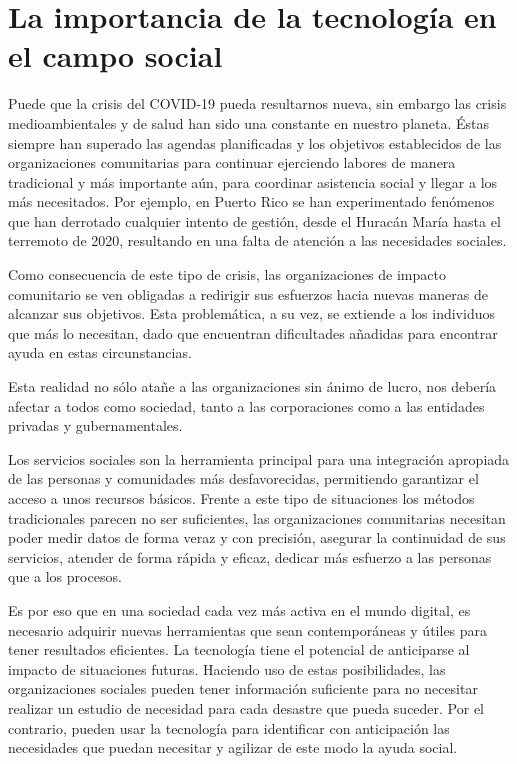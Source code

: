 \section{La importancia de la tecnología en el campo social}
Puede que la crisis del COVID-19 pueda resultarnos nueva, sin embargo las crisis medioambientales y de salud han sido una constante en nuestro planeta. Éstas siempre han superado las agendas planificadas y los objetivos establecidos de las organizaciones comunitarias para continuar ejerciendo labores de manera tradicional y más importante aún, para coordinar asistencia social y llegar a los más necesitados. Por ejemplo, en Puerto Rico se han experimentado fenómenos que han derrotado cualquier intento de gestión, desde el Huracán María hasta el terremoto de 2020, resultando en una falta de atención a las necesidades sociales.
\par Como consecuencia de este tipo de crisis, las organizaciones de impacto comunitario se ven obligadas a redirigir sus esfuerzos hacia nuevas maneras de alcanzar sus objetivos. Esta problemática, a su vez, se extiende a los individuos que más lo necesitan, dado que encuentran dificultades añadidas para encontrar ayuda en estas circunstancias.
\par Esta realidad no sólo atañe a las organizaciones sin ánimo de lucro, nos debería afectar a todos como
sociedad, tanto a las corporaciones como a las entidades privadas y gubernamentales.
\par Los servicios sociales son la herramienta principal para una integración apropiada de las personas y comunidades más desfavorecidas, permitiendo garantizar el acceso a unos recursos básicos. Frente a este tipo de situaciones los métodos tradicionales parecen no ser suficientes, las organizaciones comunitarias necesitan poder medir datos de forma veraz y con precisión, asegurar la continuidad de sus servicios, atender de forma rápida y eficaz, dedicar más esfuerzo a las personas que a los procesos.
\par Es por eso que en una sociedad cada vez más activa en el mundo digital, es necesario adquirir nuevas herramientas que sean contemporáneas y útiles para tener resultados eficientes. La tecnología tiene el potencial de anticiparse al impacto de situaciones futuras. Haciendo uso de estas posibilidades, las organizaciones sociales pueden tener información suficiente para no necesitar realizar un estudio de necesidad para cada desastre que pueda suceder. Por el contrario, pueden usar la tecnología para identificar con anticipación las necesidades que puedan necesitar y agilizar de este modo la ayuda social.
